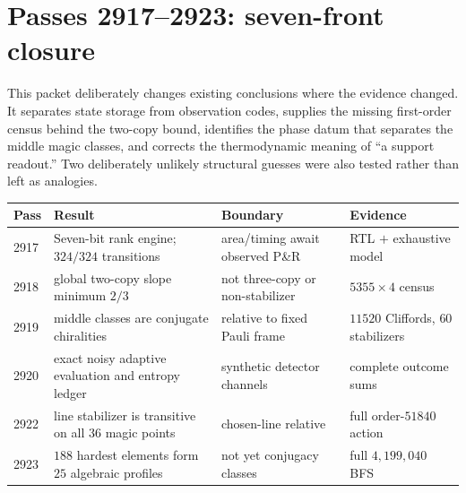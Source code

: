 \section{Passes 2917--2923: seven-front closure}
\label{sec:bt2917-bt2923-seven-front}

\begin{plain}
This packet deliberately changes existing conclusions where the evidence changed.  It
separates state storage from observation codes, supplies the missing first-order census
behind the two-copy bound, identifies the phase datum that separates the middle magic
classes, and corrects the thermodynamic meaning of ``a support readout.''  Two deliberately
unlikely structural guesses were also tested rather than left as analogies.
\end{plain}

{\small
\begin{center}
\begin{tabular}{@{}p{1.0cm}p{5.0cm}p{5.3cm}p{2.6cm}@{}}
\toprule
\textbf{Pass} & \textbf{Result} & \textbf{Boundary} & \textbf{Evidence}\\
\midrule
2917 & Seven-bit rank engine; $324/324$ transitions & area/timing await observed P\&R & RTL $+$ exhaustive model\\
2918 & global two-copy slope minimum $2/3$ & not three-copy or non-stabilizer & $5355\times4$ census\\
2919 & middle classes are conjugate chiralities & relative to fixed Pauli frame & $11520$ Cliffords, $60$ stabilizers\\
2920 & exact noisy adaptive evaluation and entropy ledger & synthetic detector channels & complete outcome sums\\
2922 & line stabilizer is transitive on all $36$ magic points & chosen-line relative & full order-$51840$ action\\
2923 & $188$ hardest elements form $25$ algebraic profiles & not yet conjugacy classes & full $4{,}199{,}040$ BFS\\
\bottomrule
\end{tabular}
\end{center}}

